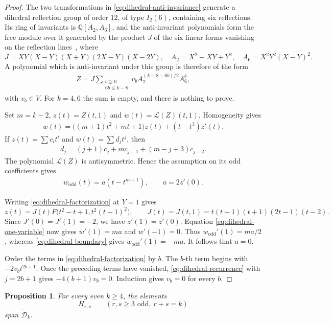 \documentclass[12pt]{amsart}
\numberwithin{equation}{section}
\theoremstyle{plain}
\newtheorem{prop}[prop]{Proposition}
\newcommand{\QQ}{\mathbb{Q}}
\newcommand{\Dtk}{\widetilde{\mathcal D}_k}
\begin{document}
\begin{proof}
The two transformations in \eqref{eq:dihedral-anti-invariance}
generate a dihedral reflection group of order $12$, of type $I_2(6)$,
containing six reflections. Its ring of invariants is
$\QQ[A_2,A_6]$, and the anti-invariant polynomials form the free
module over it generated by the product $J$ of the six linear forms
vanishing on the reflection lines~\cite[Chapter~3]{Humphreys},
where
\[
 J=XY(X-Y)(X+Y)(2X-Y)(X-2Y),\quad
 A_2=X^2-XY+Y^2,\quad A_6=X^2Y^2(X-Y)^2.
\]
A polynomial which is anti-invariant under this group is therefore of
the form
\begin{align}\label{eq:dihedral-factorization}
 Z=J\sum_{\substack{b\geq0\\6b\leq k-8}}
 v_bA_2^{(k-8-6b)/2}A_6^b,
\end{align}
with $v_b\in V$.
For $k=4,6$ the sum is empty, and there is nothing to prove.

Set $m=k-2$, $z(t)=Z(t,1)$ and $w(t)=\mathcal L(Z)(t,1)$. Homogeneity gives
\begin{align}\label{eq:dihedral-one-variable}
 w(t)=\bigl((m+1)t^2+mt+1\bigr)z(t)+(t-t^3)z'(t).
\end{align}
If $z(t)=\sum c_it^i$ and $w(t)=\sum d_jt^j$, then
\begin{align}\label{eq:dihedral-recurrence}
 d_j=(j+1)c_j+mc_{j-1}+(m-j+3)c_{j-2}.
\end{align}
The polynomial $\mathcal L(Z)$ is antisymmetric. Hence the assumption on its odd
coefficients gives
\begin{align}\label{eq:dihedral-boundary}
 w_{\mathrm{odd}}(t)=a(t-t^{m+1}),\qquad a=2z'(0).
\end{align}

Writing \eqref{eq:dihedral-factorization} at $Y=1$ gives
\[
 z(t)=J(t)F\bigl(t^2-t+1,t^2(t-1)^2\bigr),
 \qquad J(t)=J(t,1)=t(t-1)(t+1)(2t-1)(t-2).
\]
Since $J'(0)=J'(1)=-2$, we have $z'(1)=z'(0)$. Equation
\eqref{eq:dihedral-one-variable} now gives
$w'(1)=ma$ and $w'(-1)=0$. Thus
$w_{\mathrm{odd}}'(1)=ma/2$, whereas
\eqref{eq:dihedral-boundary} gives
$w_{\mathrm{odd}}'(1)=-ma$. It follows that $a=0$.

Order the terms in \eqref{eq:dihedral-factorization} by $b$. The
$b$-th term begins with $-2v_bt^{2b+1}$. Once the preceding terms have
vanished, \eqref{eq:dihedral-recurrence} with $j=2b+1$ gives
$-4(b+1)v_b=0$. Induction gives $v_b=0$ for every $b$.
\end{proof}

\begin{prop}\label{prop:H-spans-Dtilde}
For every even $k\geq4$, the elements
\[
 H_{r,s}\qquad(r,s\geq3\text{ odd},\ r+s=k)
\]
span $\Dtk$.
\end{prop}
\end{document}
